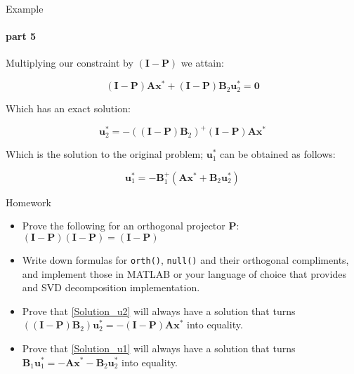 \documentclass{beamer}
\begin{document}
\begin{frame}{Example}
\framesubtitle{part 5}
\begin{flushleft}

 Multiplying our constraint by $(\mathbf{I} - \mathbf{P})$ we attain:

\begin{equation}
    (\mathbf{I} - \mathbf{P}) \mathbf{A} \mathbf{x}^* + (\mathbf{I} - \mathbf{P}) \mathbf{B}_2 \mathbf{u}^*_2 = \mathbf{0}
\end{equation}

Which has an exact solution:

\begin{equation}
\label{Solution_u2}
     \mathbf{u}^*_2 = -((\mathbf{I} - \mathbf{P}) \mathbf{B}_2)^+(\mathbf{I} - \mathbf{P}) \mathbf{A} \mathbf{x}^*
\end{equation}

Which is the solution to the original problem; $\mathbf{u}^*_1$ can be obtained as follows:

\begin{equation}
\label{Solution_u1}
      \mathbf{u}^*_1  = -\mathbf{B}^+_1(\mathbf{A} \mathbf{x}^* + \mathbf{B}_2 \mathbf{u}^*_2)
\end{equation}


\end{flushleft}
\end{frame}


\begin{frame}{Homework}
\begin{flushleft}

\begin{itemize}
    \item Prove the following for an orthogonal projector $\mathbf{P}$: $(\mathbf{I} - \mathbf{P})(\mathbf{I} - \mathbf{P}) = (\mathbf{I} - \mathbf{P})$
    \item Write down formulas for \texttt{orth()}, \texttt{null()} and their orthogonal compliments, and implement those in MATLAB or your language of choice that provides and SVD decomposition implementation.
    \item Prove that \eqref{Solution_u2} will always have a solution that turns $((\mathbf{I} - \mathbf{P}) \mathbf{B}_2) \mathbf{u}^*_2 = -(\mathbf{I} - \mathbf{P}) \mathbf{A} \mathbf{x}^*$ into equality.
    \item Prove that \eqref{Solution_u1} will always have a solution that turns $\mathbf{B}_1 \mathbf{u}^*_1 = -\mathbf{A} \mathbf{x}^* - \mathbf{B}_2 \mathbf{u}^*_2$ into equality.
\end{itemize}

\end{flushleft}
\end{frame}
\end{document}
